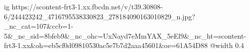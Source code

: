  
 
 
 
 

\ifcmt
  ig https://scontent-frt3-1.xx.fbcdn.net/v/t39.30808-6/244423242_4716795538330823_278184090163010829_n.jpg?_nc_cat=107&ccb=1-5&_nc_sid=8bfeb9&_nc_ohc=UxNayd7eMmYAX_5eEl9&_nc_ht=scontent-frt3-1.xx&oh=eb5cf0d09810530ac5e7b7d2aaa45601&oe=61A54D88
  @width 0.4
\fi
